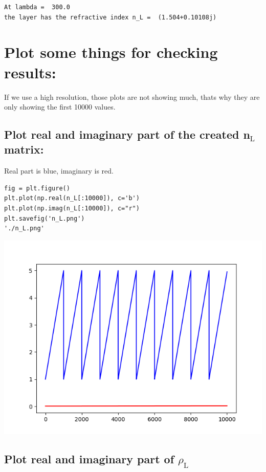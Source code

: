 \documentclass[11pt]{article}
\begin{document}
\begin{verbatim}
At lambda =  300.0
the layer has the refractive index n_L =  (1.504+0.10108j)
\end{verbatim}

\section{Plot some things for checking results:}
\label{sec:org95d0a47}

If we use a high resolution, those plots are not showing much, thats why they are only showing the first 10000 values.
\subsection{Plot real and imaginary part of the created n\(_{\text{L}}\) matrix:}
\label{sec:orga3522b1}

Real part is blue, imaginary is red.

\begin{verbatim}
fig = plt.figure()
plt.plot(np.real(n_L[:10000]), c='b')
plt.plot(np.imag(n_L[:10000]), c="r")
plt.savefig('n_L.png')
'./n_L.png'

\end{verbatim}

\begin{center}
\includegraphics[width=.9\linewidth]{./n_L.png}
\end{center}

\subsection{Plot real and imaginary part of \(\rho_{\text{L}}\)}
\label{sec:org16a36a1}
\end{document}
